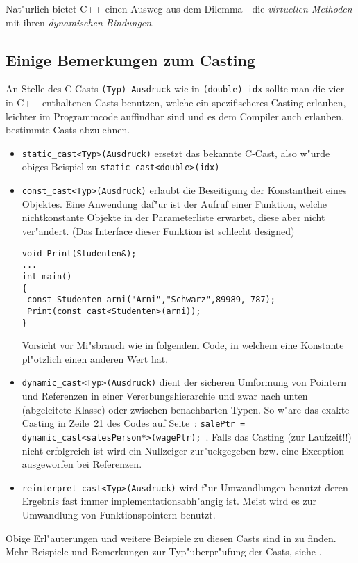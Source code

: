 Nat"urlich bietet C++ einen Ausweg aus dem Dilemma - die \emph{virtuellen Methoden}
mit ihren \emph{dynamischen Bindungen}.
%
%
\subsection{Einige Bemerkungen zum Casting}
\label{sec:A4.4}
An Stelle des C-Casts \verb|(Typ) Ausdruck| wie in \verb|(double) idx|
sollte man die vier in C++ enthaltenen Casts benutzen, welche ein spezifischeres
Casting erlauben, leichter im Programmcode auffindbar sind und es dem
Compiler auch erlauben, bestimmte Casts abzulehnen.
%
\begin{itemize}
 \item \verb|static_cast<Typ>(Ausdruck)|
 ersetzt das bekannte C-Cast, also w"urde obiges Beispiel zu
 \verb|static_cast<double>(idx)|
%
 \item \verb|const_cast<Typ>(Ausdruck)| erlaubt die
 Beseitigung der Konstantheit eines Objektes. Eine Anwendung daf"ur ist der
 Aufruf einer Funktion, welche nichtkonstante Objekte in der
 Parameterliste erwartet, diese aber nicht ver"andert.
 (Das Interface dieser Funktion ist schlecht designed)
\begin{verbatim}
void Print(Studenten&);
...
int main()
{
 const Studenten arni("Arni","Schwarz",89989, 787);
 Print(const_cast<Studenten>(arni));
}
\end{verbatim}
Vorsicht vor Mi"sbrauch wie in folgendem Code, in welchem eine Konstante pl"otzlich einen
anderen Wert hat.
%
%
%
 \item \verb|dynamic_cast<Typ>(Ausdruck)| dient
 der sicheren Umformung von Pointern und Referenzen
 in einer Vererbungshierarchie und zwar nach unten
 (abgeleitete Klasse) oder zwischen benachbarten Typen.
 So w"are das exakte Casting in Zeile~21 des Codes auf Seite~\pageref{code:a3_2}:
 \verb|salePtr = dynamic_cast<salesPerson*>(wagePtr);|~.
 Falls das Casting (zur Laufzeit!!) nicht erfolgreich ist wird ein Nullzeiger
 zur"uckgegeben bzw. eine Exception ausgeworfen bei Referenzen.
%
 \item \verb|reinterpret_cast<Typ>(Ausdruck)|
 wird f"ur Umwandlungen benutzt deren Ergebnis fast immer implementationsabh"angig ist.
 Meist wird es zur Umwandlung von Funktionspointern benutzt.
\end{itemize}
%
Obige Erl"auterungen und weitere Beispiele zu diesen Casts sind in
\cite[\S1.2]{Meyers:1997:MEC}
zu finden. Mehr Beispiele und Bemerkungen zur Typ"uberpr"ufung der Casts,
siehe
\cite[p.246f]{Schmaranz:2002:SCP}.


